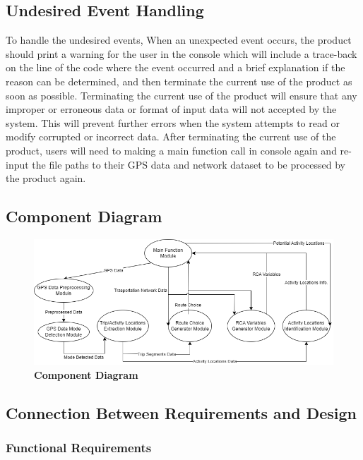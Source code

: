 \documentclass[12pt, titlepage]{article}
\begin{document}
\subsection{Undesired Event Handling}
To handle the undesired events, When an unexpected event occurs, the product should print a warning for the user in the console which will include a trace-back on the line of the code where the event occurred and a brief explanation if the reason can be determined, and then terminate the current use of the product as soon as possible. Terminating the current use of the product will ensure that any improper or erroneous data or format of input data will not accepted by the system. This will prevent further errors when the system attempts to read or modify corrupted or incorrect data. After terminating the current use of the product, users will need to making a main function call in console again and re-input the file paths to their GPS data and network dataset to be processed by the product again.


\subsection{Component Diagram}
\begin{figure}[!htbp]
    \centering
    \includegraphics[scale=0.60]{Component_Diagram.png}
    \caption{\bf Component Diagram}
\end{figure}
\newpage

\subsection{Connection Between Requirements and Design} \label{SecConnection}
  
\subsubsection{Functional Requirements}
\end{document}
